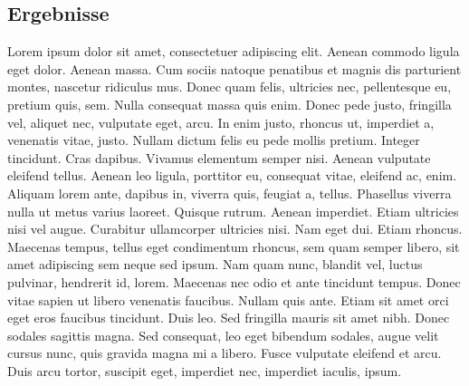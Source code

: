 \documentclass[a1paper, german, ngerman]{article}
\begin{document}
\vfill

\begin{posterbox}
	\section*{Ergebnisse}
	Lorem ipsum dolor sit amet, consectetuer adipiscing elit. Aenean commodo ligula eget dolor. Aenean massa. Cum sociis natoque penatibus et magnis dis parturient montes, nascetur ridiculus mus. Donec quam felis, ultricies nec, pellentesque eu, pretium quis, sem. Nulla consequat massa quis enim. Donec pede justo, fringilla vel, aliquet nec, vulputate eget, arcu. In enim justo, rhoncus ut, imperdiet a, venenatis vitae, justo. Nullam dictum felis eu pede mollis pretium. Integer tincidunt. Cras dapibus. Vivamus elementum semper nisi. Aenean vulputate eleifend tellus. Aenean leo ligula, porttitor eu, consequat vitae, eleifend ac, enim. Aliquam lorem ante, dapibus in, viverra quis, feugiat a, tellus. Phasellus viverra nulla ut metus varius laoreet. Quisque rutrum. Aenean imperdiet. Etiam ultricies nisi vel augue. Curabitur ullamcorper ultricies nisi. Nam eget dui. Etiam rhoncus. Maecenas tempus, tellus eget condimentum rhoncus, sem quam semper libero, sit amet adipiscing sem neque sed ipsum. Nam quam nunc, blandit vel, luctus pulvinar, hendrerit id, lorem. Maecenas nec odio et ante tincidunt tempus. Donec vitae sapien ut libero venenatis faucibus. Nullam quis ante. Etiam sit amet orci eget eros faucibus tincidunt. Duis leo. Sed fringilla mauris sit amet nibh. Donec sodales sagittis magna. Sed consequat, leo eget bibendum sodales, augue velit cursus nunc, quis gravida magna mi a libero. Fusce vulputate eleifend et arcu. Duis arcu tortor, suscipit eget, imperdiet nec, imperdiet iaculis, ipsum.
\end{posterbox}

\vfill
\end{document}
